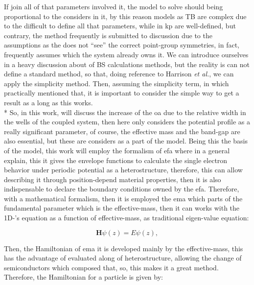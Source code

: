 If join all of that parameters involved it, the model to solve should being proportional to the considers in it, by this reason models as \gls{TB} are complex due to the difficult to define all that parameters, while in \gls{kp} are well-defined, but contrary, the method frequently is  submitted to discussion due to the assumptions as the does not ``see'' the correct point-group symmetries, in fact, frequently assumes which the system already owns it.  We can introduce ourselves in a heavy discussion about of \gls{BS} calculations methods, but the reality is can not define a standard method, so that, doing reference to Harrison \textit{et al.}\cite{harrison2016quantum}, we can apply the simplicity method.
Then, assuming the simplicity term, in which practically mentioned that, it is important to consider the simple way to get a result as a long as this works.\\*
So, in this work, will discuss the increase of the  \gls{oa}  due to the relative width in the wells of the coupled system, then here only considers the potential profile as a really significant parameter, of course, the effective mass and   the band-gap are also essential, but these are considers as a part of the model. Being this the basis of the model, this work will employ the formalism of \gls{efa} where in a general explain, this it  gives the envelope functions to calculate the single electron behavior under periodic potential as a heterostructure, therefore, this can allow describing it  through position-depend material properties\cite{foreman1996envelope,benduke1966spacecharge,bastard1990wave}, then it is also indispensable to declare the boundary conditions owned by the \gls{efa}. Therefore, with a mathematical formalism, then it is employed the \gls{ema} which parts of the fundamental  parameter which is the effective-mass, then it can works with the 1D-\sch's equation as a function of effective-mass, as traditional eigen-value equation:

\begin{equation}\label{eqn:chapter-2-sec-numerical-calculations-eigen-value-equation}
	\textbf{H}\psi(z)=E\psi(z),
\end{equation}

Then, the Hamiltonian of \gls{ema} it is developed mainly by the effective-mass, this has the advantage of evaluated along of heterostructure,  allowing  the change of semiconductors which composed that, so, this makes it a great method. Therefore, the Hamiltonian for a particle is given by\cite{kamizato1989excitons,bastard1990wave,foreman1996envelope}:

